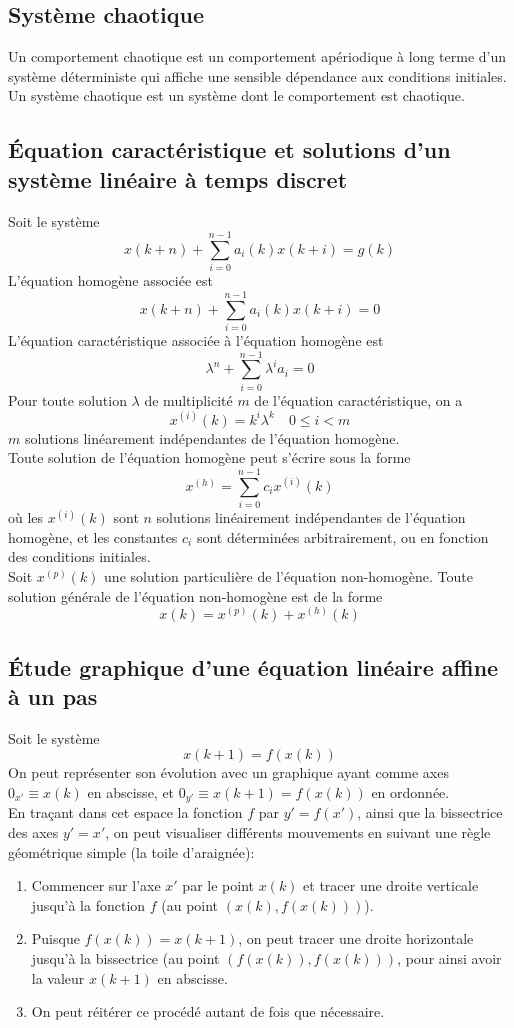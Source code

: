 \documentclass[a4paper]{article}
\begin{document}
\subsection{Système chaotique}
Un comportement chaotique est un comportement apériodique à long terme
d'un système déterministe qui affiche une sensible dépendance aux
conditions initiales.\\
Un système chaotique est un système dont le comportement est chaotique.
\subsection{Équation caractéristique et solutions d'un système linéaire à temps
discret}
Soit le système
\[x(k+n)+\sum_{i=0}^{n-1}a_i(k)x(k+i)=g(k)\]
L'équation homogène associée est
\[x(k+n)+\sum_{i=0}^{n-1}a_i(k)x(k+i)=0\]
L'équation caractéristique associée à l'équation homogène est
\[\lambda^n+\sum_{i=0}^{n-1}\lambda^ia_i=0\]
Pour toute solution \(\lambda\) de multiplicité \(m\) de l'équation
caractéristique, on a
\[x^{(i)}(k)=k^i\lambda^k\quad 0\le i<m\]
\(m\) solutions linéarement indépendantes de l'équation homogène.\\
Toute solution de l'équation homogène peut s'écrire sous la forme
\[x^{(h)}=\sum_{i=0}^{n-1}c_ix^{(i)}(k)\]
où les \(x^{(i)}(k)\) sont \(n\) solutions linéairement indépendantes de
l'équation homogène, et les constantes \(c_i\) sont déterminées
arbitrairement, ou en fonction des conditions initiales. \\
Soit \(x^{(p)}(k)\) une solution particulière de l'équation non-homogène.
Toute solution générale de l'équation non-homogène est de la forme
\[x(k)=x^{(p)}(k)+x^{(h)}(k)\]
\subsection{Étude graphique d'une équation linéaire affine à un pas}
Soit le système
\[x(k+1)=f(x(k))\]
On peut représenter son évolution avec un graphique ayant comme axes
\(0_{x'}\equiv x(k)\) en abscisse, et \(0_{y'}\equiv x(k+1)=f(x(k))\) en ordonnée.\\
En traçant dans cet espace la fonction \(f\) par \(y'=f(x')\), ainsi que la
bissectrice des axes \(y'=x'\), on peut visualiser différents mouvements
en suivant une règle géométrique simple (la toile d'araignée):
\begin{enumerate}
	\item Commencer sur l'axe \(x'\) par le point \(x(k)\) et tracer une droite
		verticale jusqu'à la fonction \(f\) (au point \((x(k),f(x(k)))\)).
	\item Puisque \(f(x(k))=x(k+1)\), on peut tracer une droite horizontale
		jusqu'à la bissectrice (au point \((f(x(k)),f(x(k)))\), pour ainsi
		avoir la valeur \(x(k+1)\) en abscisse.
	\item On peut réitérer ce procédé autant de fois que nécessaire.
\end{enumerate}
\end{document}
